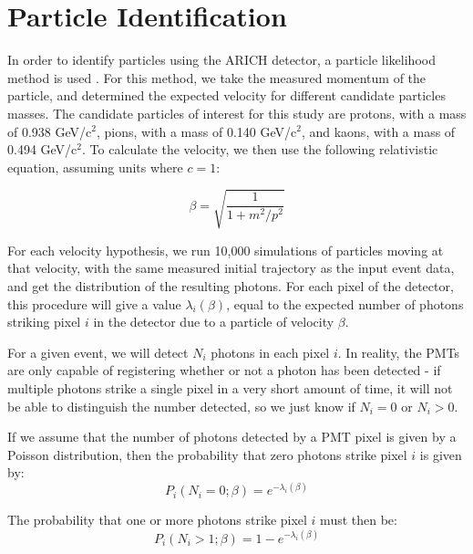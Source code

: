 
\chapter{Particle Identification}
\label{ch:Results}
\label{sec:particleIdentification}
In order to identify particles using the \ac{ARICH} detector, a particle likelihood method is used \cite{richImpact, belleArich}.
For this method, we take the measured momentum of the particle, and determined the expected velocity for different candidate particles masses.
The candidate particles of interest for this study are protons, with a mass of 0.938 GeV/c$^2$, pions, with a mass of 0.140 GeV/c$^2$, and kaons, with a mass of 0.494 GeV/c$^2$.
To calculate the velocity, we then use the following relativistic equation, assuming units where $c = 1$:

\begin{equation}
\label{eq:relMass}
 \beta = \sqrt{\frac{1}{1 +m^2 / p^2}}
\end{equation}


For each velocity hypothesis, we run 10,000 simulations of particles moving at that velocity, with the same measured initial trajectory as the input event data, and get the distribution of the resulting photons.
For each pixel of the detector, this procedure will give a value $\lambda_i(\beta)$, equal to the expected number of photons striking pixel $i$ in the detector due to a particle of velocity $\beta$. 

For a given event, we will detect $N_i$ photons in each pixel $i$.
In reality, the PMTs are only capable of registering whether or not a photon has been detected - if multiple photons strike a single pixel in a very short amount of time, it will not be able to distinguish the number detected, so we just know if $N_i = 0$ or $N_i > 0$.

If we assume that the number of photons detected by a PMT pixel is given by a Poisson distribution, then the probability that zero photons strike pixel $i$ is given by:
\begin{equation}
P_i(N_i=0; \beta) = e^{-\lambda_i(\beta)}
\end{equation}

 The probability that one or more photons strike pixel $i$ must then be:
\begin{equation}
P_i(N_i>1; \beta) = 1 - e^{-\lambda_i(\beta)}
\end{equation}

